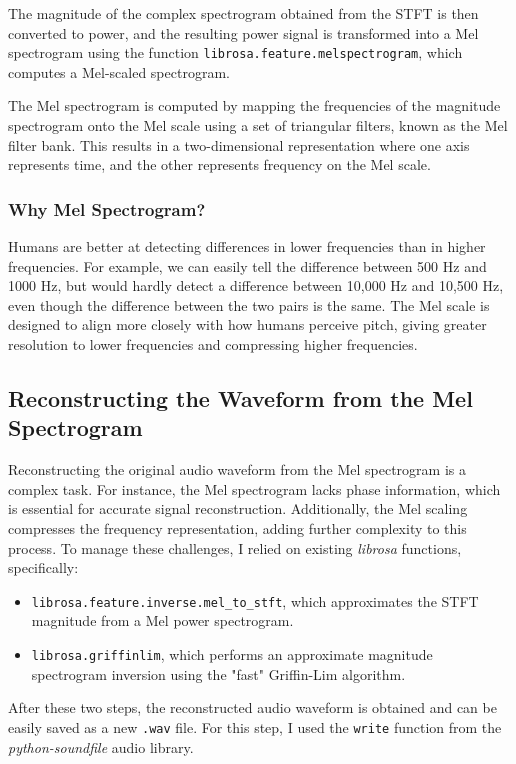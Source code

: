 \documentclass[12pt]{article}
\begin{document}
The magnitude of the complex spectrogram obtained from the STFT is then converted to power, and the resulting power signal is transformed into a Mel spectrogram using the function \texttt{librosa.feature.melspectrogram}, which computes a Mel-scaled spectrogram.

The Mel spectrogram is computed by mapping the frequencies of the magnitude spectrogram onto the Mel scale using a set of triangular filters, known as the Mel filter bank. This results in a two-dimensional representation where one axis represents time, and the other represents frequency on the Mel scale.

\subsubsection{Why Mel Spectrogram?}
Humans are better at detecting differences in lower frequencies than in higher frequencies. For example, we can easily tell the difference between 500 Hz and 1000 Hz, but would hardly detect a difference between 10,000 Hz and 10,500 Hz, even though the difference between the two pairs is the same. The Mel scale is designed to align more closely with how humans perceive pitch, giving greater resolution to lower frequencies and compressing higher frequencies.


\subsection{Reconstructing the Waveform from the Mel Spectrogram}

Reconstructing the original audio waveform from the Mel spectrogram is a complex task. For instance, the Mel spectrogram lacks phase information, which is essential for accurate signal reconstruction. Additionally, the Mel scaling compresses the frequency representation, adding further complexity to this process. To manage these challenges, I relied on existing \textit{librosa} functions, specifically:

\begin{itemize}
    \item \texttt{librosa.feature.inverse.mel\_to\_stft}, which approximates the STFT magnitude from a Mel power spectrogram.
    \item \texttt{librosa.griffinlim}, which performs an approximate magnitude spectrogram inversion using the "fast" Griffin-Lim algorithm.
\end{itemize}

After these two steps, the reconstructed audio waveform is obtained and can be easily saved as a new \texttt{.wav} file. For this step, I used the \texttt{write} function from the \textit{python-soundfile} audio library.
\end{document}
